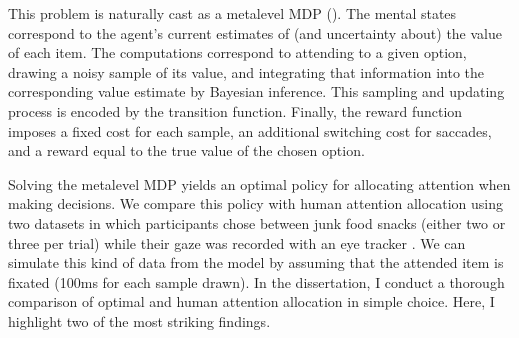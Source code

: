 \documentclass[dsingle]{memo}
\begin{document}
This problem is naturally cast as a metalevel MDP (). The mental states correspond to the agent's current estimates of (and uncertainty about) the value of each item. The computations correspond to attending to a given option, drawing a noisy sample of its value, and integrating that information into the corresponding value estimate by Bayesian inference. This sampling and updating process is encoded by the transition function. Finally, the reward function imposes a fixed cost for each sample, an additional switching cost for saccades, and a reward equal to the true value of the chosen option.

Solving the metalevel MDP yields an optimal policy for allocating attention when making decisions. We compare this policy with human attention allocation using two datasets in which participants chose between junk food snacks (either two or three per trial) while their gaze was recorded with an eye tracker \citep{krajbich2010visual,krajbich2011multialternative}. We can simulate this kind of data from the model by assuming that the attended item is fixated (100ms for each sample drawn). In the dissertation, I conduct a thorough comparison of optimal and human attention allocation in simple choice. Here, I highlight two of the most striking findings.

\end{document}
